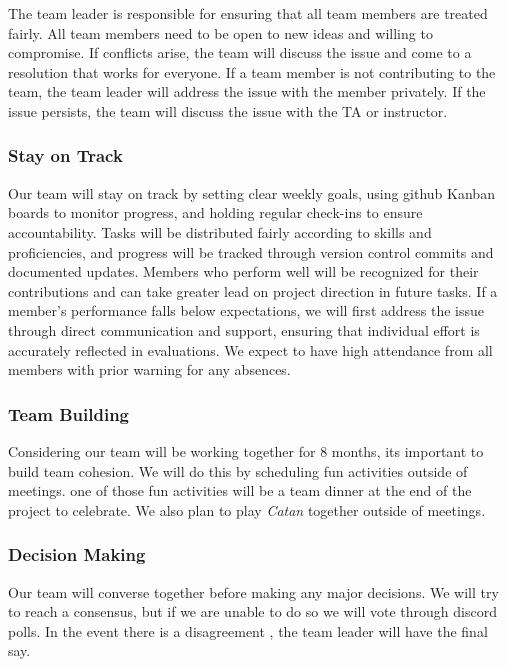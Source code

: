 \documentclass{article}
\begin{document}
\raggedright
The team leader is responsible for ensuring that all team members are treated fairly.
All team members need to be open to new ideas and willing to compromise. If conflicts
arise, the team will discuss the issue and come to a resolution that works for everyone.
If a team member is not contributing to the team, the team leader will address the issue
with the member privately. If the issue persists, the team will discuss the issue with
the TA or instructor.

\subsubsection*{Stay on Track}

Our team will stay on track by setting clear weekly goals, 
using github Kanban boards to monitor progress, and 
holding regular check-ins to ensure accountability. Tasks 
will be distributed fairly according to skills and proficiencies, 
and progress will be tracked through version control commits and 
documented updates. Members who perform well will be recognized 
for their contributions and can take greater lead on project
direction in future tasks. If a member's performance 
falls below expectations, we will first address the issue 
through direct communication and support, ensuring that 
individual effort is accurately reflected in evaluations.
We expect to have high attendance from all members with prior 
warning for any absences.

\subsubsection*{Team Building}


\raggedright
Considering our team will be working together for 8 months, its important to build
team cohesion. We will do this by scheduling fun activities outside of meetings. one
of those fun activities will be a team dinner at the end of the project to celebrate.
We also plan to play \textit{Catan} together outside of meetings. 

\subsubsection*{Decision Making} 


\raggedright
Our team will converse together before making any major decisions. We will try to reach
a consensus, but if we are unable to do so we will vote through discord polls. In the event
there is a disagreement , the team leader will have the final say.
\end{document}

